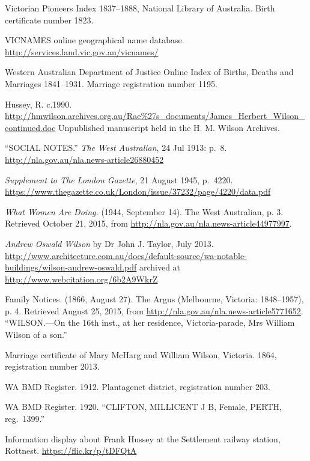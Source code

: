 \begin{thebibliography}{999}
\footnotesize

	Victorian Pioneers Index 1837--1888, National Library of Australia.
	Birth certificate number 1823.

	VICNAMES online geographical name database.
	\url{http://services.land.vic.gov.au/vicnames/}

	Western Australian Department of Justice Online Index of Births, Deaths and Marriages 1841–1931.
	Marriage registration number 1195.

	Hussey, R. c.1990. \url{http://hmwilson.archives.org.au/Rae\%27s_documents/James_Herbert_Wilson_continued.doc}
	Unpublished manuscript held in the H. M. Wilson Archives.

	``SOCIAL NOTES.'' \emph{The West Australian}, 24 Jul 1913: p.\ 8.
	\url{http://nla.gov.au/nla.news-article26880452}

	\emph{Supplement to The London Gazette}, 21 August 1945, p.\ 4220.
	\url{https://www.thegazette.co.uk/London/issue/37232/page/4220/data.pdf}

	\emph{What Women Are Doing.} (1944, September 14). The West Australian, p. 3.
	Retrieved October 21, 2015, from \url{http://nla.gov.au/nla.news-article44977997}.

	\emph{Andrew Oswald Wilson} by Dr John J. Taylor, July 2013.
	\url{http://www.architecture.com.au/docs/default-source/wa-notable-buildings/wilson-andrew-oswald.pdf}
	archived at \url{http://www.webcitation.org/6b2A9WkrZ}

	Family Notices. (1866, August 27). The Argus (Melbourne, Victoria: 1848--1957), p. 4.
	Retrieved August 25, 2015, from \url{http://nla.gov.au/nla.news-article5771652}.
	``WILSON.---On the 16th inst., at her residence, Victoria-parade, Mrs William Wilson of a son.''

	Marriage certificate of Mary McHarg and William Wilson, Victoria. 1864, registration number 2013.

	WA BMD Register. 1912. Plantagenet district, registration number 203.

	WA BMD Register. 1920.
	``CLIFTON, MILLICENT J B, Female, PERTH, reg.\ 1399.''

	Information display about Frank Hussey at the Settlement railway station, Rottnest.
	\url{https://flic.kr/p/tDFQtA}


\end{thebibliography}
